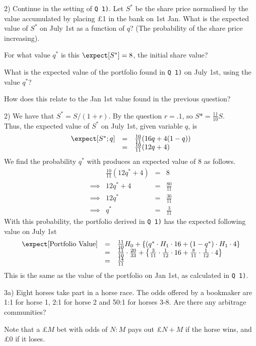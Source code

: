 \documentclass[11pt,a4paper]{article}
\begin{document}
\begin{question}{2)}
  Continue in the setting of \texttt{Q 1)}. Let $S^*$ be the share price normalised by the value accumulated by placing £1 in the bank on 1st Jan. What is the expected value of $S^*$ on July 1st as a function of $q$? (The probability of the share price increasing).
  \par For what value $q^*$ is this $\expect[S^*]=8$, the initial share value?
  \par What is the expected value of the portfolio found in \texttt{Q 1)} on July 1st, using the value $q^*$?
  \par How does this relate to the Jan 1st value found in the previous question?
\end{question}

\begin{answer}{2)}
  We have that $S^*=S/(1+r)$. By the question $r=.1$, so $S*=\frac{11}{10}S$.\\
  Thus, the expected value of $S^*$ on July 1st, given variable $q$, is
  \[\begin{array}{rcl}
    \expect[S^*;q]&=&\frac{10}{11}(16q+4(1-q))\\
    &=&\frac{10}{11}(12q+4)
  \end{array}\]
  We find the probability $q^*$ with produces an expected value of 8 as follows.
  \[\begin{array}{rrcl}
    &\frac{10}{11}(12q^*+4)&=&8\\
    \implies&12q^*+4&=&\frac{80}{11}\\
    \implies&12q^*&=&\frac{36}{11}\\
    \implies&q^*&=&\frac{3}{11}
  \end{array}\]
  With this probability, the portfolio derived in \texttt{Q 1)} has the expected following value on July 1st
  \[\begin{array}{rcl}
    \expect[\text{Portfolio Value}]&=&\frac{11}{10}H_0+\left\{(q^*\cdot H_1\cdot 16+(1-q^*)\cdot H_1\cdot4\right\}\\
    &=&\frac{11}{10}\cdot\frac{20}{33}+\left\{\frac3{11}\cdot\frac1{12}\cdot16+\frac{8}{11}\cdot\frac1{12}\cdot4\right\}\\
    &=&\frac{14}{11}
  \end{array}\]
  This is the same as the value of the portfolio on Jan 1st, as calculated in \texttt{Q 1)}.
\end{answer}

\begin{question}{3a)}
  Eight horses take part in a horse race. The odds offered by a bookmaker are 1:1 for horse 1, 2:1 for horse 2 and 50:1 for horses 3-8. Are there any arbitrage communities?
  \par Note that a £$M$ bet with odds of $N:M$ pays out £$N+M$ if the horse wins, and £0 if it loses.
\end{question}
\end{document}
